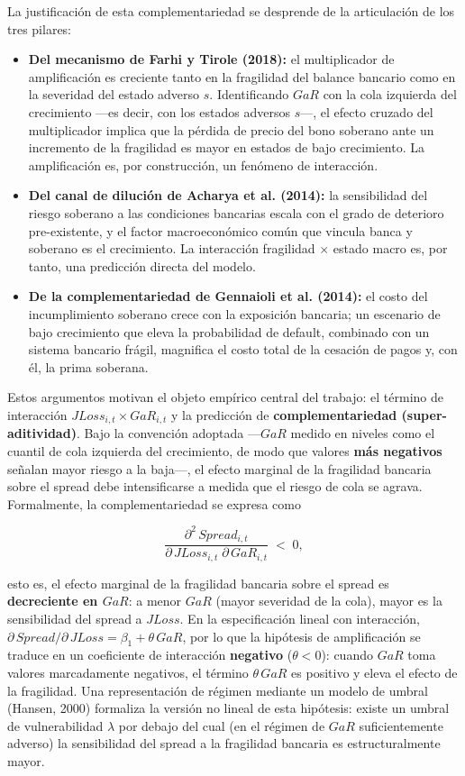 \documentclass[5p,times,twocolumn,authoryear]{elsarticle}
\begin{document}
La justificación de esta complementariedad se desprende de la articulación de los tres pilares:

\begin{itemize}
    \item \textbf{Del mecanismo de Farhi y Tirole (2018):} el multiplicador de amplificación es creciente tanto en la fragilidad del balance bancario como en la severidad del estado adverso $s$. Identificando $GaR$ con la cola izquierda del crecimiento —es decir, con los estados adversos $s$—, el efecto cruzado del multiplicador implica que la pérdida de precio del bono soberano ante un incremento de la fragilidad es mayor en estados de bajo crecimiento. La amplificación es, por construcción, un fenómeno de interacción.
    \item \textbf{Del canal de dilución de Acharya et al. (2014):} la sensibilidad del riesgo soberano a las condiciones bancarias escala con el grado de deterioro pre-existente, y el factor macroeconómico común que vincula banca y soberano es el crecimiento. La interacción fragilidad $\times$ estado macro es, por tanto, una predicción directa del modelo.
    \item \textbf{De la complementariedad de Gennaioli et al. (2014):} el costo del incumplimiento soberano crece con la exposición bancaria; un escenario de bajo crecimiento que eleva la probabilidad de default, combinado con un sistema bancario frágil, magnifica el costo total de la cesación de pagos y, con él, la prima soberana.
\end{itemize}

Estos argumentos motivan el objeto empírico central del trabajo: el término de interacción $JLoss_{i,t}\times GaR_{i,t}$ y la predicción de \textbf{complementariedad (super-aditividad)}. Bajo la convención adoptada —$GaR$ medido en niveles como el cuantil de cola izquierda del crecimiento, de modo que valores \textbf{más negativos} señalan mayor riesgo a la baja—, el efecto marginal de la fragilidad bancaria sobre el spread debe intensificarse a medida que el riesgo de cola se agrava. Formalmente, la complementariedad se expresa como

\[ \frac{\partial^{2}\, Spread_{i,t}}{\partial\, JLoss_{i,t}\;\partial\, GaR_{i,t}} \;<\; 0, \]

esto es, el efecto marginal de la fragilidad bancaria sobre el spread es \textbf{decreciente en $GaR$}: a menor $GaR$ (mayor severidad de la cola), mayor es la sensibilidad del spread a $JLoss$. En la especificación lineal con interacción, $\partial\, Spread/\partial\, JLoss = \beta_{1} + \theta\,GaR$, por lo que la hipótesis de amplificación se traduce en un coeficiente de interacción \textbf{negativo} ($\theta < 0$): cuando $GaR$ toma valores marcadamente negativos, el término $\theta\,GaR$ es positivo y eleva el efecto de la fragilidad. Una representación de régimen mediante un modelo de umbral (Hansen, 2000) formaliza la versión no lineal de esta hipótesis: existe un umbral de vulnerabilidad $\lambda$ por debajo del cual (en el régimen de $GaR$ suficientemente adverso) la sensibilidad del spread a la fragilidad bancaria es estructuralmente mayor.
\end{document}
